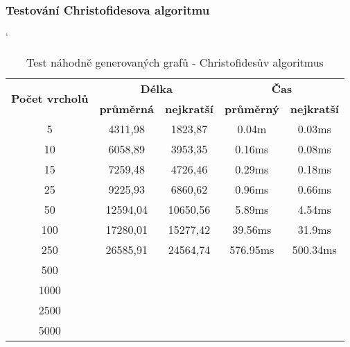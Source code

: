 \documentclass[
  printversion=false,
  joinlists=true,
  glossaries=true,
  figures=true,
  tables=true,
  sourcecodes=false,
  theorems=false,
  bibencoding=utf8,
  language=czech,
  encoding=utf8,
  program=infpvs,
  index=true,
  biblatex=true
]{kidiplom}
\begin{document}
\subsubsection{Testování Christofidesova algoritmu}

\begin{table}[H]
\catcode`
\centering
\begin{tabular}{|c|c|c|c|c|}
\hline
\multirow{2}{*}{\textbf{Počet vrcholů}} & \multicolumn{2}{c|}{\textbf{Délka}}                                              & \multicolumn{2}{c|}{\textbf{Čas}} \\ \cline{2-5}
& \textbf{průměrná} & \textbf{nejkratší} & \textbf{průměrný} & \textbf{nejkratší} \\
\hline
5                      & 4311,98                 & 1823,87                  & 0.04m                 & 0.03ms                 \\
10                     & 6058,89                 & 3953,35                  & 0.16ms                & 0.08ms                 \\
15                     & 7259,48                 & 4726,46                  & 0.29ms                & 0.18ms                 \\
25                     & 9225,93                 & 6860,62                  & 0.96ms                & 0.66ms                 \\
50                     & 12594,04                & 10650,56                 & 5.89ms                & 4.54ms                 \\
100                    & 17280,01                & 15277,42                 & 39.56ms               & 31.9ms                 \\
250                    & 26585,91                & 24564,74                 & 576.95ms              & 500.34ms               \\
500                    &                         &                          &                       &                        \\
1000                   &                         &                          &                       &                        \\
2500                   &                         &                          &                       &                        \\
5000                   &                         &                          &                       &                        \\ \hline
\end{tabular}
\caption{Test náhodně generovaných grafů - Christofidesův algoritmus}
\end{table}
\end{document}
